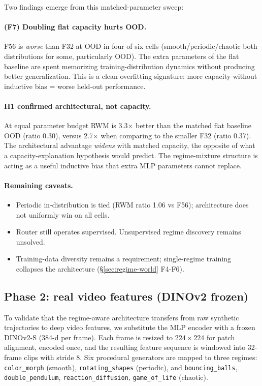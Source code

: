 \documentclass[11pt,a4paper]{article}
\begin{document}
Two findings emerge from this matched-parameter sweep:

\paragraph{(F7) Doubling flat capacity hurts OOD.} F56 is \emph{worse}
than F32 at OOD in four of six cells (smooth/periodic/chaotic both
distributions for some, particularly OOD). The extra parameters of
the flat baseline are spent memorizing training-distribution dynamics
without producing better generalization. This is a clean overfitting
signature: more capacity without inductive bias = worse held-out
performance.

\paragraph{H1 confirmed architectural, not capacity.} At equal
parameter budget RWM is 3.3$\times$ better than the matched flat
baseline OOD (ratio 0.30), versus 2.7$\times$ when comparing to the
smaller F32 (ratio 0.37). The architectural advantage \emph{widens}
with matched capacity, the opposite of what a capacity-explanation
hypothesis would predict. The regime-mixture structure is acting as
a useful inductive bias that extra MLP parameters cannot replace.

\paragraph{Remaining caveats.}
\begin{itemize}
\item Periodic in-distribution is tied (RWM ratio 1.06 vs F56);
  architecture does not uniformly win on all cells.
\item Router still operates supervised. Unsupervised regime discovery
  remains unsolved.
\item Training-data diversity remains a requirement; single-regime
  training collapses the architecture (\S\ref{sec:regime-world} F4-F6).
\end{itemize}

\subsection{Phase 2: real video features (DINOv2 frozen)}
\label{sec:rwm-video}

To validate that the regime-aware architecture transfers from raw
synthetic trajectories to deep video features, we substitute the MLP
encoder with a frozen DINOv2-S (384-d per frame). Each frame is
resized to $224\times224$ for patch alignment, encoded once, and the
resulting feature sequence is windowed into 32-frame clips with
stride 8. Six procedural generators are mapped to three regimes:
\verb|color_morph| (smooth), \verb|rotating_shapes| (periodic), and
\verb|bouncing_balls|, \verb|double_pendulum|, \verb|reaction_diffusion|,
\verb|game_of_life| (chaotic).
\end{document}
